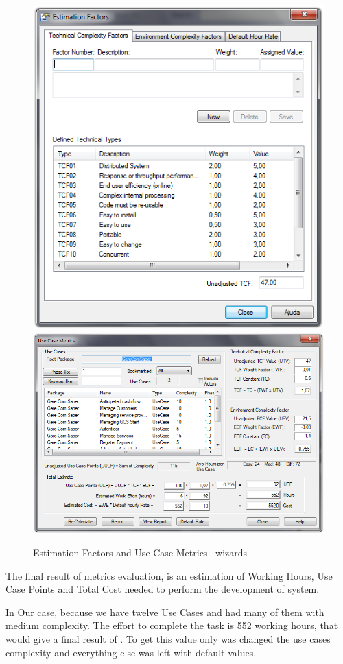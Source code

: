 \begin{figure}[H]
\includegraphics[scale=0.257]{images/sparxestim.png}
\hspace{0.1cm}
\includegraphics[scale=0.29]{images/sparx.png}
\caption{Estimation Factors and Use Case Metrics \entArch\ wizards}\label{img:sparxRes}
\end{figure}

The final result of metrics evaluation, is an estimation of Working Hours, Use Case Points\cite{Ribu01estimatingobject-oriented} and Total Cost needed to perform the development of system.

In Our case, because we have twelve Use Cases and had many of them with medium complexity. The effort to complete the task is 552 working hours, that would give a final result of . 
To get this value only was changed the use cases complexity and everything else was left with default values.
